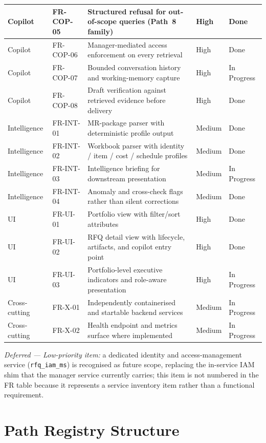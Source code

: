 \begin{longtable}{|p{1.2cm}|p{1.8cm}|p{6.6cm}|p{1.4cm}|p{1.6cm}|}
Copilot & FR-COP-05 & Structured refusal for out-of-scope queries (Path~8 family) & High & Done \\ \hline
Copilot & FR-COP-06 & Manager-mediated access enforcement on every retrieval & High & Done \\ \hline
Copilot & FR-COP-07 & Bounded conversation history and working-memory capture & High & In Progress \\ \hline
Copilot & FR-COP-08 & Draft verification against retrieved evidence before delivery & High & Done \\ \hline
Intelligence & FR-INT-01 & MR-package parser with deterministic profile output & Medium & Done \\ \hline
Intelligence & FR-INT-02 & Workbook parser with identity / item / cost / schedule profiles & Medium & Done \\ \hline
Intelligence & FR-INT-03 & Intelligence briefing for downstream presentation & Medium & In Progress \\ \hline
Intelligence & FR-INT-04 & Anomaly and cross-check flags rather than silent corrections & Medium & Done \\ \hline
UI & FR-UI-01 & Portfolio view with filter/sort attributes & High & Done \\ \hline
UI & FR-UI-02 & RFQ detail view with lifecycle, artifacts, and copilot entry point & High & Done \\ \hline
UI & FR-UI-03 & Portfolio-level executive indicators and role-aware presentation & High & In Progress \\ \hline
Cross-cutting & FR-X-01 & Independently containerised and startable backend services & Medium & In Progress \\ \hline
Cross-cutting & FR-X-02 & Health endpoint and metrics surface where implemented & Medium & In Progress \\ \hline
\end{longtable}
\endgroup

\textit{Deferred — Low-priority item:} a dedicated identity and access-management service (\texttt{rfq\_iam\_ms}) is recognised as future scope, replacing the in-service IAM shim that the manager service currently carries; this item is not numbered in the FR table because it represents a service inventory item rather than a functional requirement.

\section{Path Registry Structure}
\label{app:path-registry}

